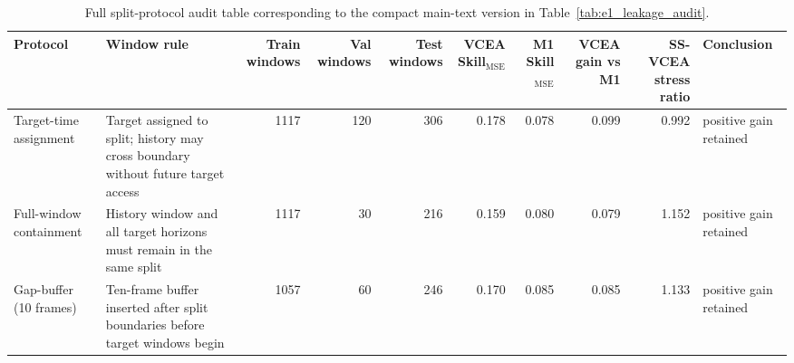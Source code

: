 \documentclass[lettersize,journal]{IEEEtran}
\begin{document}
\begin{table}[!t]
\centering
\scriptsize
\begin{adjustbox}{max width=\textwidth}
\begin{tabular}{llrrrrrrrp{}}
\toprule
Protocol & Window rule & Train windows & Val windows & Test windows & VCEA Skill$_{\mathrm{MSE}}$ & M1 Skill$_{\mathrm{MSE}}$ & VCEA gain vs M1 & SS-VCEA stress ratio & Conclusion \\
\midrule
Target-time assignment & Target assigned to split; history may cross boundary without future target access & 1117 & 120 & 306 & 0.178 & 0.078 & 0.099 & 0.992 & positive gain retained \\
Full-window containment & History window and all target horizons must remain in the same split & 1117 & 30 & 216 & 0.159 & 0.080 & 0.079 & 1.152 & positive gain retained \\
Gap-buffer (10 frames) & Ten-frame buffer inserted after split boundaries before target windows begin & 1057 & 60 & 246 & 0.170 & 0.085 & 0.085 & 1.133 & positive gain retained \\
\bottomrule
\end{tabular}
\end{adjustbox}
\caption{Full split-protocol audit table corresponding to the compact main-text version in Table~\ref{tab:e1_leakage_audit}.}
\label{tab:e1_leakage_audit_full}
\end{table}
\end{document}
